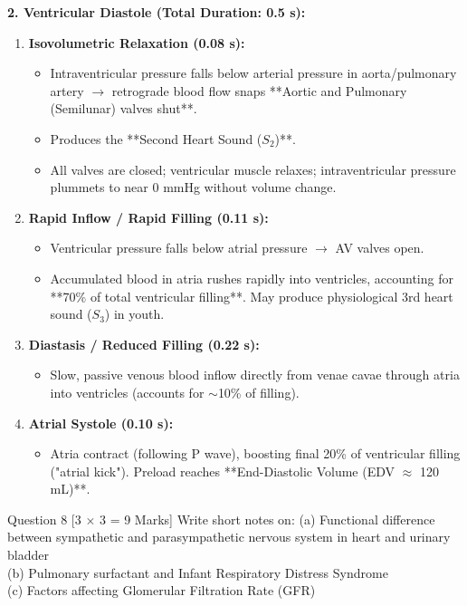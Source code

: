 \documentclass[11pt,a4paper]{article}
\begin{document}
\begin{ansbox}
\textbf{2. Ventricular Diastole (Total Duration: 0.5 s):}
\begin{enumerate}[leftmargin=*]
    \item \textbf{Isovolumetric Relaxation (0.08 s):}
    \begin{itemize}
        \item Intraventricular pressure falls below arterial pressure in aorta/pulmonary artery $\rightarrow$ retrograde blood flow snaps **Aortic and Pulmonary (Semilunar) valves shut**.
        \item Produces the **Second Heart Sound ($S_2$)**.
        \item All valves are closed; ventricular muscle relaxes; intraventricular pressure plummets to near 0 mmHg without volume change.
    \end{itemize}
    \item \textbf{Rapid Inflow / Rapid Filling (0.11 s):}
    \begin{itemize}
        \item Ventricular pressure falls below atrial pressure $\rightarrow$ AV valves open.
        \item Accumulated blood in atria rushes rapidly into ventricles, accounting for **70\% of total ventricular filling**. May produce physiological 3rd heart sound ($S_3$) in youth.
    \end{itemize}
    \item \textbf{Diastasis / Reduced Filling (0.22 s):}
    \begin{itemize}
        \item Slow, passive venous blood inflow directly from venae cavae through atria into ventricles (accounts for $\sim$10\% of filling).
    \end{itemize}
    \item \textbf{Atrial Systole (0.10 s):}
    \begin{itemize}
        \item Atria contract (following P wave), boosting final 20\% of ventricular filling ("atrial kick"). Preload reaches **End-Diastolic Volume (EDV $\approx$ 120 mL)**.
    \end{itemize}
\end{enumerate}
\end{ansbox}

\begin{qbox}{Question 8 [3 $\times$ 3 = 9 Marks]}
Write short notes on:
(a) Functional difference between sympathetic and parasympathetic nervous system in heart and urinary bladder \\
(b) Pulmonary surfactant and Infant Respiratory Distress Syndrome \\
(c) Factors affecting Glomerular Filtration Rate (GFR)
\end{qbox}
\end{document}
